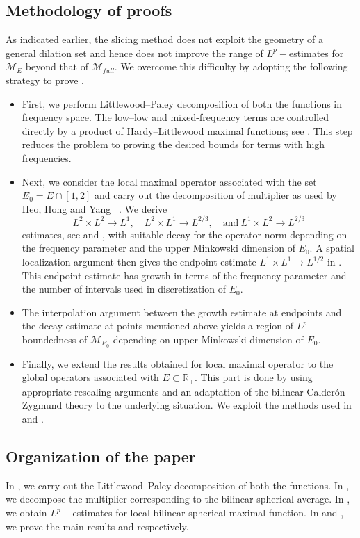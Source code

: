 \documentclass[a4paper,reqno]{amsart}
\numberwithin{equation}{section}
\newcommand{\R}{{\mathbb {R}}}
\begin{document}
	\subsection*{Methodology of proofs}
	As indicated earlier, the slicing method does not exploit the geometry of a general dilation set and hence does not improve the range of $L^p-$estimates for $\mathcal M_{E}$ beyond that of $\mathcal M_{full}$. We overcome this difficulty by adopting the following strategy to prove .  
	\begin{itemize}
		\item First, we perform Littlewood--Paley decomposition of both the functions in frequency space. The low--low and mixed-frequency terms are controlled directly by a product of Hardy--Littlewood maximal functions; see . This step reduces the problem to proving the desired bounds for terms with high frequencies. 
		\item Next, we consider the local maximal operator associated with the set $E_0=E\cap [1,2]$ and carry out the decomposition of multiplier as used by Heo, Hong and Yang~ \cite{HHY}. We derive
		\[L^2\times L^2\to L^1,\quad L^2\times L^1\to L^{2/3}, \quad \text{and}~L^1\times L^2\to L^{2/3}\]
		estimates, see  and , with suitable decay for the operator norm depending on the frequency parameter and the upper Minkowski dimension of $E_0$. A spatial localization argument then gives the endpoint estimate $L^1\times L^1\to L^{1/2}$ in . This endpoint estimate has growth in terms of the frequency parameter and the number of intervals used in discretization of $E_0$. 
		\item The interpolation argument between the growth estimate at endpoints and the decay estimate at points mentioned above yields a region of $L^p-$boundedness of $\mathcal{M}_{E_0}$ depending on upper Minkowski dimension of $E_0$.
		\item Finally, we extend the results obtained for local maximal operator to the global operators associated with $E\subset\R_+$. This part is done by using appropriate rescaling arguments and an adaptation of the bilinear Calderón-Zygmund theory to the underlying situation. We exploit the methods used in \cite{ChristZhou} and \cite{BCSS2}.
	\end{itemize}	
	\subsection*{Organization of the paper} In , we carry out the Littlewood--Paley decomposition of both the functions. In , we decompose the multiplier corresponding to the bilinear spherical average. In , we obtain $L^p-$estimates for local bilinear spherical maximal function. In  and , we prove the main results  and  respectively.
\end{document}
